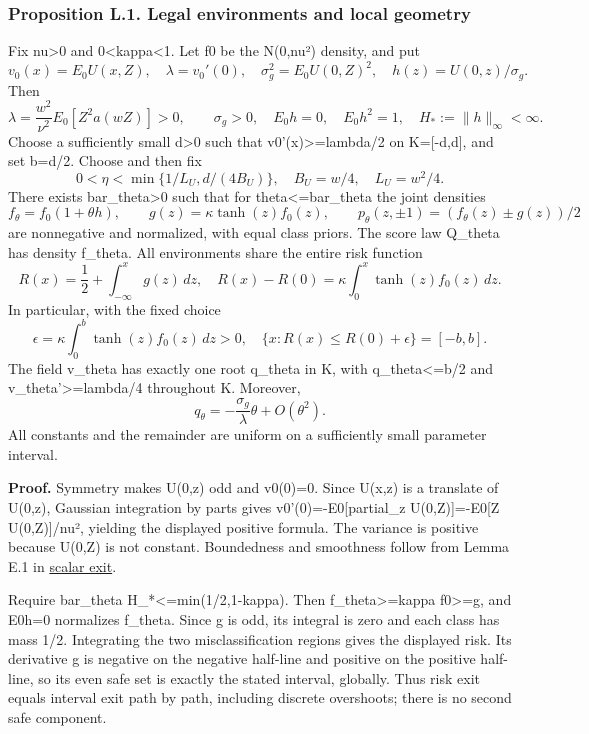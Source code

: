 \subsubsection{Proposition L.1. Legal environments and local
geometry}\label{local_prediction-proposition-l.1.-legal-environments-and-local-geometry}

Fix nu\textgreater0 and 0\textless kappa\textless1. Let f0 be the
N(0,nu²) density, and put \[
v_0(x)=E_0 U(x,Z),\quad \lambda=v_0'(0),\quad
\sigma_g^2=E_0 U(0,Z)^2,\quad h(z)=U(0,z)/\sigma_g.
\] Then \[
\lambda=\frac{w^2}{\nu^2}E_0[Z^2a(wZ)]>0,\qquad \sigma_g>0,
\quad E_0h=0,\quad E_0h^2=1,\quad H_*:=\|h\|_\infty<\infty.
\] Choose a sufficiently small d\textgreater0 such that
v0'(x)\textgreater=lambda/2 on K={[}-d,d{]}, and set b=d/2. Choose and
then fix \[
0<\eta<\min\{1/L_U,d/(4B_U)\},\quad B_U=w/4,\quad L_U=w^2/4.
\] There exists bar\_theta\textgreater0 such that for
\textbar theta\textbar\textless=bar\_theta the joint densities \[
f_\theta=f_0(1+\theta h),\qquad g(z)=\kappa\tanh(z)f_0(z),
\qquad p_\theta(z,\pm1)=(f_\theta(z)\pm g(z))/2
\] are nonnegative and normalized, with equal class priors. The score
law Q\_theta has density f\_theta. All environments share the entire
risk function \[
R(x)=\frac12+\int_{-\infty}^x g(z)\,dz,
\quad R(x)-R(0)=\kappa\int_0^x\tanh(z)f_0(z)\,dz.
\] In particular, with the fixed choice \[
\epsilon=\kappa\int_0^b\tanh(z)f_0(z)\,dz>0,
\quad \{x:R(x)\le R(0)+\epsilon\}=[-b,b].
\] The field v\_theta has exactly one root q\_theta in K, with
\textbar q\_theta\textbar\textless=b/2 and
v\_theta'\textgreater=lambda/4 throughout K. Moreover, \[
q_\theta=-\frac{\sigma_g}{\lambda}\theta+O(\theta^2).
\tag{L.1}
\] All constants and the remainder are uniform on a sufficiently small
parameter interval.

\textbf{Proof.} Symmetry makes U(0,z) odd and v0(0)=0. Since U(x,z) is a
translate of U(0,z), Gaussian integration by parts gives
v0'(0)=-E0{[}partial\_z U(0,Z){]}=-E0{[}Z U(0,Z){]}/nu², yielding the
displayed positive formula. The variance is positive because U(0,Z) is
not constant. Boundedness and smoothness follow from Lemma E.1 in
\href{scalar_exit.md}{scalar exit}.

Require bar\_theta H\_*\textless=min(1/2,1-kappa). Then
f\_theta\textgreater=kappa f0\textgreater=\textbar g\textbar, and E0h=0
normalizes f\_theta. Since g is odd, its integral is zero and each class
has mass 1/2. Integrating the two misclassification regions gives the
displayed risk. Its derivative g is negative on the negative half-line
and positive on the positive half-line, so its even safe set is exactly
the stated interval, globally. Thus risk exit equals interval exit path
by path, including discrete overshoots; there is no second safe
component.


